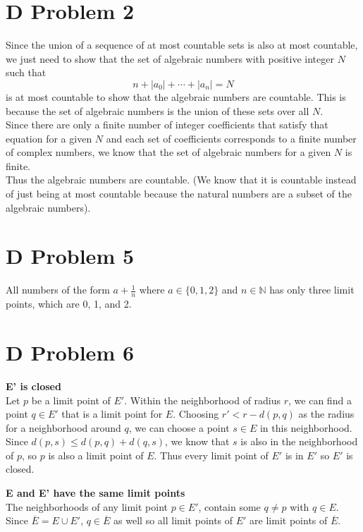 \documentclass{article}
\begin{document}
\section*{D Problem 2}
Since the union of a sequence of 
at most countable sets is also at most countable,
we just need to show that the set of algebraic numbers with 
positive integer $N$ such that
\[
    n + |a_0| + \cdots + |a_n| = N
\]
is at most countable to show that the algebraic numbers are countable.
This is because the set of algebraic numbers is the union 
of these sets over all $N$.\\

Since there are only a finite number of integer coefficients that satisfy that equation 
for a given $N$ and each set of coefficients corresponds to a finite number of 
complex numbers, we know that the set of algebraic numbers for a given $N$
is finite.\\

Thus the algebraic numbers are countable.
(We know that it is countable instead of just being at most countable 
because the natural numbers are a subset of the algebraic numbers).
\newpage 

\section*{D Problem 5}
All numbers of the form $a + \frac{1}{n}$ where $a \in \{0, 1, 2\}$ and $n \in \mathbb{N}$
has only three limit points, which are 0, 1, and 2.
\newpage 

\section*{D Problem 6}
\textbf{E' is closed} \\
Let $p$ be a limit point of $E'$.
Within the neighborhood of radius $r$, 
we can find a point $q \in E'$ that is a limit point for $E$.
Choosing $r' < r - d(p, q)$ as the radius for a neighborhood 
around $q$, we can choose a point $s \in E$ in this neighborhood.
Since $d(p, s) \leq d(p, q) + d(q,s)$, we know that 
$s$ is also in the neighborhood of $p$, so $p$ is also a 
limit point of $E$.
Thus every limit point of $E'$ is in $E'$ so $E'$ is closed.

\textbf{E and E' have the same limit points} \\
The neighborhoods of any limit point $p \in E'$, 
contain some $q \neq p$ with $q \in E$.
Since $\overline{E} = E \cup E'$,
$q \in \overline{E}$ as well so 
all limit points of $E'$ are limit points of $\overline{E}$.
\end{document}
